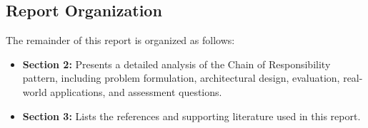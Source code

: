 \subsection{Report Organization}
The remainder of this report is organized as follows:
\begin{itemize}
    \item \textbf{Section 2:} Presents a detailed analysis of the Chain of Responsibility pattern, including problem formulation, architectural design, evaluation, real-world applications, and assessment questions.
    \item \textbf{Section 3:} Lists the references and supporting literature used in this report.
\end{itemize}